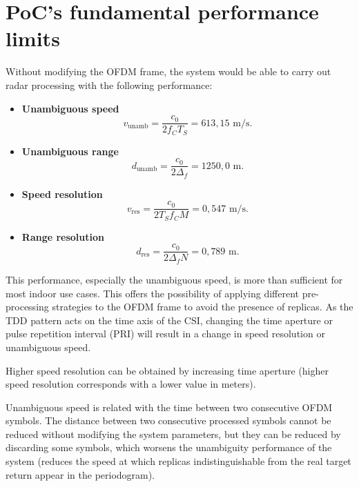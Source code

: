 \section{PoC's fundamental performance limits}

Without modifying the OFDM frame, the system would be able to carry out radar processing with the following performance:

\begin{itemize}
	\item \textbf{Unambiguous speed}
	\vspace{-\baselineskip} %
	\begin{equation}
		v_{\text{unamb}} = \frac{c_0}{2f_C T_S} = 613,15\text{ m/s}.
	\end{equation}
	
	\item \textbf{Unambiguous range}
	\begin{equation}
		d_{\text{unamb}} = \frac{c_0}{2\Delta_f} = 1250,0\text{ m}.
	\end{equation}
	\item \textbf{Speed resolution}
	\begin{equation}
		v_{\text{res}} = \frac{c_0}{2T_Sf_CM} = 0,547 \text{ m/s}.
	\end{equation} 
	\item \textbf{Range resolution}
	\begin{equation}
		d_{\text{res}} = \frac{c_0}{2\Delta_fN} = 0,789 \text{ m}.
	\end{equation}  
\end{itemize}
	
	This performance, especially the unambiguous speed, is more than sufficient for most indoor use cases. 
	This offers the possibility of applying different pre-processing strategies to the OFDM frame to avoid the presence of replicas. 
	As the TDD pattern acts on the time axis of the CSI, changing the time aperture or pulse repetition interval (PRI) will result in a change in speed resolution or unambiguous speed.
	
	Higher speed resolution can be obtained by increasing time aperture (higher speed resolution corresponds with a lower value in meters).
	
	Unambiguous speed is related with the time between two consecutive OFDM symbols. The distance between two consecutive processed symbols cannot be reduced without modifying the system parameters, but they can be reduced by discarding some symbols, which worsens the unambiguity performance of the system (reduces the speed at which replicas indistinguishable from the real target return appear in the periodogram).
	
